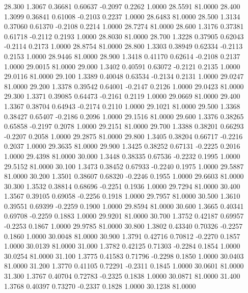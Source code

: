   28.300   1.3067   0.36681   0.60637  -0.2097   0.2262   1.0000  28.5591  81.0000
  28.400   1.3099   0.36841   0.61008  -0.2103   0.2237   1.0000  28.6483  81.0000
  28.500   1.3134   0.37060   0.61370  -0.2108   0.2214   1.0000  28.7274  81.0000
  28.600   1.3176   0.37381   0.61718  -0.2112   0.2193   1.0000  28.8030  81.0000
  28.700   1.3228   0.37905   0.62043  -0.2114   0.2173   1.0000  28.8754  81.0000
  28.800   1.3303   0.38949   0.62334  -0.2113   0.2153   1.0000  28.9446  81.0000
  28.900   1.3418   0.41170   0.62614  -0.2108   0.2137   1.0000  29.0015  81.0000
  29.000   1.3402   0.40591   0.63072  -0.2121   0.2135   1.0000  29.0116  81.0000
  29.100   1.3389   0.40048   0.63534  -0.2134   0.2131   1.0000  29.0247  81.0000
  29.200   1.3378   0.39542   0.64001  -0.2147   0.2126   1.0000  29.0423  81.0000
  29.300   1.3371   0.39085   0.64473  -0.2161   0.2119   1.0000  29.0669  81.0000
  29.400   1.3367   0.38704   0.64943  -0.2174   0.2110   1.0000  29.1021  81.0000
  29.500   1.3368   0.38427   0.65407  -0.2186   0.2096   1.0000  29.1516  81.0000
  29.600   1.3376   0.38265   0.65858  -0.2197   0.2078   1.0000  29.2151  81.0000
  29.700   1.3388   0.38201   0.66293  -0.2207   0.2058   1.0000  29.2875  81.0000
  29.800   1.3405   0.38204   0.66717  -0.2216   0.2037   1.0000  29.3635  81.0000
  29.900   1.3425   0.38252   0.67131  -0.2225   0.2016   1.0000  29.4398  81.0000
  30.000   1.3448   0.38335   0.67536  -0.2232   0.1995   1.0000  29.5152  81.0000
  30.100   1.3473   0.38452   0.67933  -0.2240   0.1975   1.0000  29.5887  81.0000
  30.200   1.3501   0.38607   0.68320  -0.2246   0.1955   1.0000  29.6603  81.0000
  30.300   1.3532   0.38814   0.68696  -0.2251   0.1936   1.0000  29.7294  81.0000
  30.400   1.3567   0.39105   0.69058  -0.2256   0.1918   1.0000  29.7957  81.0000
  30.500   1.3610   0.39551   0.69399  -0.2259   0.1900   1.0000  29.8594  81.0000
  30.600   1.3665   0.40341   0.69708  -0.2259   0.1883   1.0000  29.9201  81.0000
  30.700   1.3752   0.42187   0.69957  -0.2253   0.1867   1.0000  29.9785  81.0000
  30.800   1.3802   0.43340   0.70326  -0.2257   0.1860   1.0000  30.0048  81.0000
  30.900   1.3791   0.42716   0.70812  -0.2270   0.1857   1.0000  30.0139  81.0000
  31.000   1.3782   0.42125   0.71303  -0.2284   0.1854   1.0000  30.0254  81.0000
  31.100   1.3775   0.41583   0.71796  -0.2298   0.1850   1.0000  30.0403  81.0000
  31.200   1.3770   0.41105   0.72291  -0.2311   0.1845   1.0000  30.0601  81.0000
  31.300   1.3767   0.40704   0.72783  -0.2325   0.1838   1.0000  30.0871  81.0000
  31.400   1.3768   0.40397   0.73270  -0.2337   0.1828   1.0000  30.1238  81.0000
